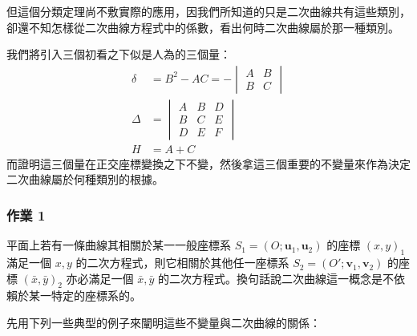 但這個分類定理尚不敷實際的應用，因我們所知道的只是二次曲線共有這些類別，卻還不知怎樣從二次曲線方程式中的係數，看出何時二次曲線屬於那一種類別。

我們將引入三個初看之下似是人為的三個量：
\begin{equation}
\begin{aligned}
\delta &= B^2 - AC = -\begin{vmatrix} A & B \\ B & C \end{vmatrix} \\[0.5em]
\Delta &= \begin{vmatrix} A & B & D \\ B & C & E \\ D & E & F \end{vmatrix} \\[0.5em]
H &= A + C
\end{aligned}
\label{eq:b4s-ch4-invariants-def}
\end{equation}
而證明這三個量在正交座標變換之下不變，然後拿這三個重要的不變量來作為決定二次曲線屬於何種類別的根據。

\subsubsection*{作業 1}
平面上若有一條曲線其相關於某一一般座標系 $S_1 = (O; \mathbf{u}_1, \mathbf{u}_2)$ 的座標 $(x, y)_1$ 滿足一個 $x, y$ 的二次方程式，則它相關於其他任一座標系 $S_2 = (O'; \mathbf{v}_1, \mathbf{v}_2)$ 的座標 $(\bar{x}, \bar{y})_2$ 亦必滿足一個 $\bar{x}, \bar{y}$ 的二次方程式。換句話說二次曲線這一概念是不依賴於某一特定的座標系的。

先用下列一些典型的例子來闡明這些不變量與二次曲線的關係：

